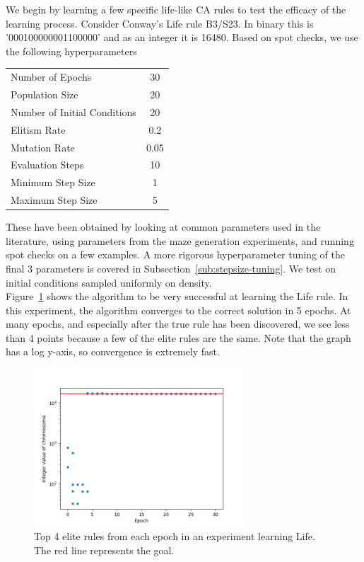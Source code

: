 We begin by learning a few specific life-like CA rules to test the efficacy of the learning process. Consider Conway's Life rule B3/S23. In binary this is '000100000001100000' and as an integer it is 16480. Based on spot checks, we use the following hyperparameters\\ 
\begin{center}\label{tab:hyperparams}
    \begin{tabular}{ l c }
        Number of Epochs & 30\\
        Population Size & 20\\
        Number of Initial Conditions & 20\\
        Elitism Rate & 0.2\\
        Mutation Rate & 0.05\\
        Evaluation Steps & 10\\
        Minimum Step Size & 1\\
        Maximum Step Size & 5\\
    \end{tabular}
\end{center}
These have been obtained by looking at common parameters used in the literature, using parameters from the maze generation experiments, and running spot checks on a few examples. A more rigorous hyperparameter tuning of the final 3 parameters is covered in Subsection~\ref{sub:stepsize-tuning}. We test on initial conditions sampled uniformly on density.\\ 

Figure~\ref{fig:life-convgraph} shows the algorithm to be very successful at learning the Life rule. In this experiment, the algorithm converges to the correct solution in 5 epochs. At many epochs, and especially after the true rule has been discovered, we see less than 4 points because a few of the elite rules are the same. Note that the graph has a log y-axis, so convergence is extremely fast.\\

\begin{figure}[H]
\centering
\includegraphics[width=0.7\textwidth]{images/life_like_eval/life-convgraph.png}
\caption{Top 4 elite rules from each epoch in an experiment learning Life. The red line represents the goal.}
\label{fig:life-convgraph}
\end{figure}

